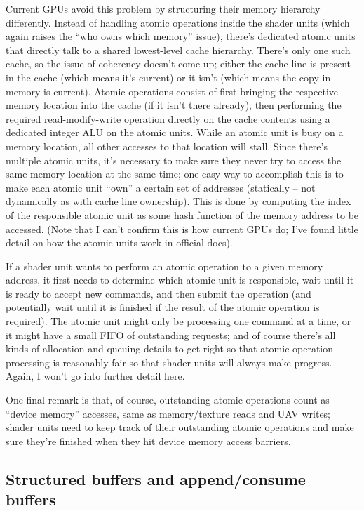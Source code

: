 \documentclass[12pt]{article}
\begin{document}
Current GPUs avoid this problem by structuring their memory hierarchy differently. Instead of handling atomic operations inside the shader units (which again raises the “who owns which memory” issue), there’s dedicated atomic units that directly talk to a shared lowest-level cache hierarchy. There’s only one such cache, so the issue of coherency doesn’t come up; either the cache line is present in the cache (which means it’s current) or it isn’t (which means the copy in memory is current). Atomic operations consist of first bringing the respective memory location into the cache (if it isn’t there already), then performing the required read-modify-write operation directly on the cache contents using a dedicated integer ALU on the atomic units. While an atomic unit is busy on a memory location, all other accesses to that location will stall. Since there’s multiple atomic units, it’s necessary to make sure they never try to access the same memory location at the same time; one easy way to accomplish this is to make each atomic unit “own” a certain set of addresses (statically – not dynamically as with cache line ownership). This is done by computing the index of the responsible atomic unit as some hash function of the memory address to be accessed. (Note that I can’t confirm this is how current GPUs do; I’ve found little detail on how the atomic units work in official docs).

If a shader unit wants to perform an atomic operation to a given memory address, it first needs to determine which atomic unit is responsible, wait until it is ready to accept new commands, and then submit the operation (and potentially wait until it is finished if the result of the atomic operation is required). The atomic unit might only be processing one command at a time, or it might have a small FIFO of outstanding requests; and of course there’s all kinds of allocation and queuing details to get right so that atomic operation processing is reasonably fair so that shader units will always make progress. Again, I won’t go into further detail here.

One final remark is that, of course, outstanding atomic operations count as “device memory” accesses, same as memory/texture reads and UAV writes; shader units need to keep track of their outstanding atomic operations and make sure they’re finished when they hit device memory access barriers.

\subsection{Structured buffers and append/consume buffers}
\label{sec:orge007121}
\end{document}
